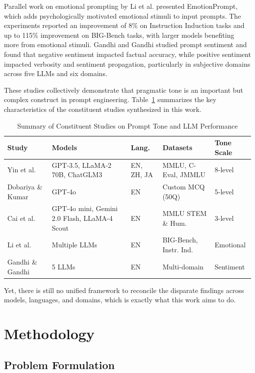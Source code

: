 \documentclass[conference]{IEEEtran}
\begin{document}
Parallel work on emotional prompting by Li et al. \cite{b9} presented EmotionPrompt, which adds psychologically motivated emotional stimuli to input prompts. The experiments reported an improvement of 8\% on Instruction Induction tasks and up to 115\% improvement on BIG-Bench tasks, with larger models benefiting more from emotional stimuli. Gandhi and Gandhi \cite{b10} studied prompt sentiment and found that negative sentiment impacted factual accuracy, while positive sentiment impacted verbosity and sentiment propagation, particularly in subjective domains across five LLMs and six domains.

These studies collectively demonstrate that pragmatic tone is an important but complex construct in prompt engineering. Table~\ref{tab:studies} summarizes the key characteristics of the constituent studies synthesized in this work.

\begin{table}[htbp]
\caption{Summary of Constituent Studies on Prompt Tone and LLM Performance}
\label{tab:studies}
\centering
\begin{tabular}{p{1.5cm}p{2.2cm}p{0.8cm}p{1.4cm}p{0.9cm}}
\toprule
\textbf{Study} & \textbf{Models} & \textbf{Lang.} & \textbf{Datasets} & \textbf{Tone Scale} \\
\midrule
Yin et al. \cite{b6} & GPT-3.5, LLaMA-2 70B, ChatGLM3 & EN, ZH, JA & MMLU, C-Eval, JMMLU & 8-level \\
\midrule
Dobariya \& Kumar \cite{b7} & GPT-4o & EN & Custom MCQ (50Q) & 5-level \\
\midrule
Cai et al. \cite{b8} & GPT-4o mini, Gemini 2.0 Flash, LLaMA-4 Scout & EN & MMLU STEM \& Hum. & 3-level \\
\midrule
Li et al. \cite{b9} & Multiple LLMs & EN & BIG-Bench, Instr. Ind. & Emotional \\
\midrule
Gandhi \& Gandhi \cite{b10} & 5 LLMs & EN & Multi-domain & Sentiment \\
\bottomrule
\end{tabular}
\end{table}

Yet, there is still no unified framework to reconcile the disparate findings across models, languages, and domains, which is exactly what this work aims to do.

\section{Methodology}

\subsection{Problem Formulation}
\end{document}
